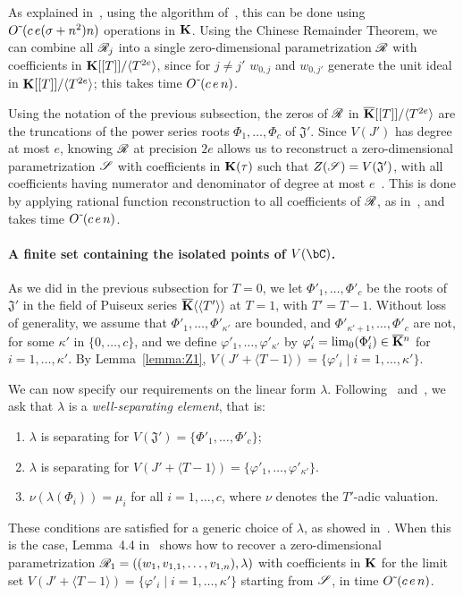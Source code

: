 \documentclass[12pt]{article}
\begin{document}
As explained in~\cite[Section~2.2]{SaSc16}, using the algorithm
of~\cite{GiLeSa01}, this can be done using ${O}{\,\tilde{ }\,}(c\,e (\sigma+n^2)n)$
operations in $\mathbf{K}$.  Using the Chinese Remainder Theorem, we can
combine all $\mathscr{R}_{j}$ into a single zero-dimensional parametrization
$\mathscr{R}$ with coefficients in $\mathbf{K}[[T]]/\langle T^{2e}\rangle$, since
for $j\ne j'$ $w_{0,j}$ and $w_{0,j'}$ generate the unit ideal in
$\mathbf{K}[[T]]/\langle T^{2e}\rangle$; this takes time 
${O}{\,\tilde{ }\,}(c\,e\,n)$.

Using the notation of the previous subsection, the zeros of $\mathscr{R}$ in
$\overline{\mathbf{K}}[[T]]/\langle T^{2e}\rangle$ are the truncations of the power
series roots $\Phi_1,\dots,\Phi_c$ of $\mathfrak{J}'$. Since $V(J')$ has
degree at most $e$, knowing $\mathscr{R}$ at precision $2e$ allows us to
reconstruct a zero-dimensional parametrization $\mathscr{S}$ with
coefficients in $\mathbf{K}(\tau)$ such that $Z(\mathscr{S})=V(\mathfrak{J}')$,
with all coefficients having numerator and denominator of degree at
most $e$~\cite[Theorem~1]{Schost03}.  This is done by applying
rational function reconstruction to all coefficients of $\mathscr{R}$, as
in~\cite{Schost03}, and takes time ${O}{\,\tilde{ }\,}(c\,e\,n)$.


\paragraph{A finite set containing the isolated points of $V(\bC)$.}
As we did in the previous subsection for $T=0$, we let
$\Phi'_1,\dots,\Phi'_c$ be the roots of $\mathfrak{J}'$ in the field
of Puiseux series $\overline{\mathbf{K}}\langle\langle T'\rangle\rangle$ at $T=1$,
with $T'=T-1$. Without loss of generality, we assume that
$\Phi'_1,\dots,\Phi'_{\kappa'}$ are bounded, and
$\Phi'_{\kappa'+1},\dots,\Phi'_c$ are not, for some $\kappa'$ in
$\{0,\dots,c\}$, and we define $\varphi'_1,\dots,\varphi'_{\kappa'}$ by
$\varphi'_i=\lim_0(\Phi'_i)\in\overline{\mathbf{K}}{}^n$ for $i=1,\dots,\kappa'$.  By
Lemma~\ref{lemma:Z1},
$V(J' + \langle T-1\rangle) = \{ \varphi'_i \mid i=1,\dots,\kappa'\}$.

We can now specify our requirements on the linear form $\lambda$.
Following~\cite{RRS} and~\cite{SaSc16}, we ask that $\lambda$ is a
{\em well-separating element}, that is:
\begin{enumerate}
\item $\lambda$ is separating for $V(\mathfrak{J}')=\{\Phi'_1,\dots,\Phi'_c\}$;
\item $\lambda$ is separating for $V(J' + \langle T-1\rangle) = \{ \varphi'_1,\dots,\varphi'_{\kappa'}\}$.
\item $\nu(\lambda(\Phi_i)) = \mu_i$ for all $i=1,\dots,c$, where $\nu$ denotes
 the $T'$-adic valuation.
\end{enumerate}
These conditions are satisfied for a generic choice of $\lambda$, as
showed in~\cite{SaSc16}. When this is the case, Lemma~4.4
in~\cite{RRS} shows how to recover a zero-dimensional parametrization
$\mathscr{R}_1=((w_1,v_{1,1},\dots,v_{1,n}),\lambda)$ with coefficients in
$\mathbf{K}$ for the limit set $V(J' + \langle T-1\rangle) =\{\varphi'_i \mid i=1,\dots,{\kappa'}\}$
starting from $\mathscr{S}$, in time 
${O}{\,\tilde{ }\,}(c\,e\,n)$.
\end{document}
